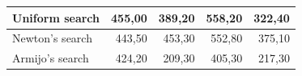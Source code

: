 \documentclass[a4paper,english,titlepage,12pt]{article}
\begin{document}
\begin{table}[H]
\begin{tabular}{|l|r|r|r|r|}
    Uniform search                                                             & \cellcolor[HTML]{FCEDEC}455,00                           & 389,20                                                    & 558,20                                                    & \cellcolor[HTML]{F0F9F5}322,40                            \\ \hline
    Newton's search                                                             & \cellcolor[HTML]{F0F9F5}443,50                           & 453,30                                                    & 552,80                                                    & 375,10                                                    \\ \hline
    Armijo's search                                                              & \cellcolor[HTML]{7BC9A3}424,20                           & \cellcolor[HTML]{7BC9A3}209,30                            & \cellcolor[HTML]{7BC9A3}405,30                            & \cellcolor[HTML]{7BC9A3}217,30                            \\ \hline
    \end{tabular}
\end{table}
\end{document}
